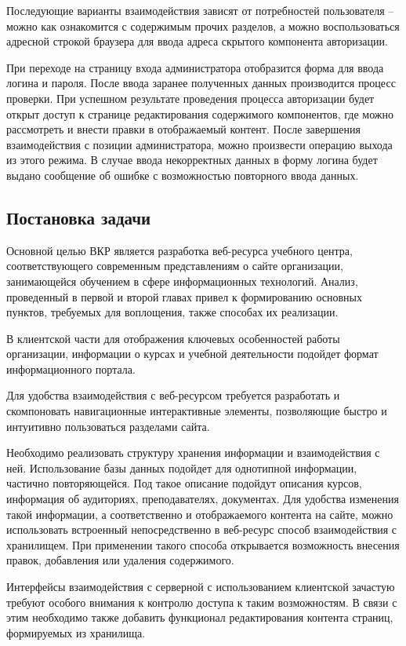 Последующие варианты взаимодействия зависят от потребностей пользователя -- можно как ознакомится с содержимым прочих разделов, а можно воспользоваться адресной строкой браузера для ввода адреса скрытого компонента авторизации.

При переходе на страницу входа администратора отобразится форма для ввода логина и пароля.
После ввода заранее полученных данных производится процесс проверки.
При успешном результате проведения процесса авторизации будет открыт доступ к странице редактирования содержимого компонентов, где можно рассмотреть и внести правки в отображаемый контент.
После завершения взаимодействия с позиции администратора, можно произвести операцию выхода из этого режима.
В случае ввода некорректных данных в форму логина будет выдано сообщение об ошибке с возможностью повторного ввода данных.


\subsection{Постановка задачи}\label{Постановка задачи}

Основной целью ВКР является разработка веб-ресурса учебного центра, соответствующего современным представлениям о сайте организации, занимающейся обучением в сфере информационных технологий.
Анализ, проведенный в первой и второй главах привел к формированию основных пунктов, требуемых для воплощения, также способах их реализации.

В клиентской части для отображения ключевых особенностей работы организации, информации о курсах и учебной деятельности подойдет формат информационного портала.

Для удобства взаимодействия с веб-ресурсом требуется разработать и скомпоновать навигационные интерактивные элементы, позволяющие быстро и интуитивно пользоваться разделами сайта.

Необходимо реализовать структуру хранения информации и взаимодействия с ней.
Использование базы данных подойдет для однотипной информации, частично повторяющейся.
Под такое описание подойдут описания курсов, информация об аудиториях, преподавателях, документах.
Для удобства изменения такой информации, а соответственно и отображаемого контента на сайте, можно использовать встроенный непосредственно в веб-ресурс способ взаимодействия с хранилищем.
При применении такого способа открывается возможность внесения правок, добавления или удаления содержимого.

Интерфейсы взаимодействия с серверной с использованием клиентской зачастую требуют особого внимания к контролю доступа к таким возможностям.
В связи с этим необходимо также добавить функционал редактирования контента страниц, формируемых из хранилища.

